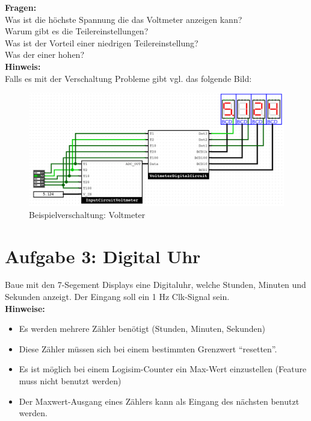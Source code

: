 \documentclass[a4paper]{scrartcl}
\begin{document}
\textbf{Fragen:}\\
Was ist die höchste Spannung die das Voltmeter anzeigen kann?\\
Warum gibt es die Teilereinstellungen?\\
Was ist der Vorteil einer niedrigen Teilereinstellung?\\
Was der einer hohen?\\

\textbf{Hinweis:}\\
Falls es mit der Verschaltung Probleme gibt vgl. das folgende Bild:
\begin{figure}[h!]
  \includegraphics[width=\textwidth]{Voltmeter_Dig.png}
  \caption{Beispielverschaltung: Voltmeter}
\end{figure}




\section*{Aufgabe 3: Digital Uhr}
Baue mit den 7-Segement Displays eine Digitaluhr, welche Stunden, Minuten und Sekunden anzeigt. Der Eingang soll ein 1 Hz Clk-Signal sein.\\

\textbf{Hinweise:}
\begin{itemize}
  \item Es werden mehrere Zähler benötigt (Stunden, Minuten, Sekunden)
  \item Diese Zähler müssen sich bei einem bestimmten Grenzwert ``resetten''. 
  \item Es ist möglich bei einem Logisim-Counter ein Max-Wert einzustellen (Feature muss nicht benutzt werden)
  \item Der Maxwert-Ausgang eines Zählers kann als Eingang des nächsten benutzt werden.
\end{itemize}
\end{document}
